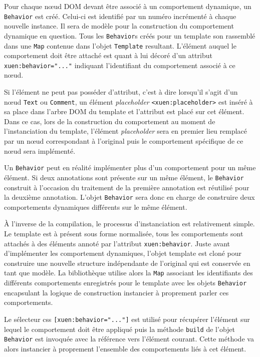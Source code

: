 Pour chaque nœud DOM devant être associé à un comportement dynamique, un \texttt{Behavior} est créé. Celui-ci est identifié par un numéro incrémenté à chaque nouvelle instance. Il sera de modèle pour la construction du comportement dynamique en question. Tous les \texttt{Behavior}s créés pour un template son rassemblé dans une \texttt{Map} contenue dans l'objet \texttt{Template} resultant. L'élément auquel le comportement doit être attaché est quant à lui décoré d'un attribut \texttt{xuen:behavior="..."} indiquant l'identifiant du comportement associé à ce nœud.

Si l'élément ne peut pas posséder d'attribut, c'est à dire lorsqu'il s'agit d'un nœud \texttt{Text} ou \texttt{Comment}, un élément \emph{placeholder} \texttt{<xuen:placeholder>} est inséré à sa place dans l'arbre DOM du template et l'attribut est placé sur cet élément. Dans ce cas, lors de la construction du comportement au moment de l'instanciation du template, l'élément \emph{placeholder} sera en premier lieu remplacé par un nœud correspondant à l'original puis le comportement spécifique de ce nœud sera implémenté.

Un \texttt{Behavior} peut en réalité implémenter plus d'un comportement pour un même élément. Si deux annotations sont présente sur un même élément, le \texttt{Behavior} construit à l'occasion du traitement de la première annotation est réutilisé pour la deuxième annotation. L'objet \texttt{Behavior} sera donc en charge de construire deux comportements dynamiques différents sur le même élément.

À l'inverse de la compilation, le processus d'instanciation est relativement simple. Le template est à présent sous forme normalisée, tous les comportements sont attachés à des éléments annoté par l'attribut \texttt{xuen:behavior}. Juste avant d'implémenter les comportement dynamiques, l'objet template est cloné pour construire une nouvelle structure indépendante de l'original qui est conservée en tant que modèle. La bibliothèque utilise alors la \texttt{Map} associant les identifiants des différents comportements enregistrés pour le template avec les objets \texttt{Behavior} encapsulant la logique de construction instancier à proprement parler ces comportements.

Le sélecteur css \texttt{[xuen:behavior="..."]} est utilisé pour récupérer l'élément sur lequel le comportement doit être appliqué puis la méthode \texttt{build} de l'objet \texttt{Behavior} est invoquée avec la référence vers l'élément courant. Cette méthode va alors instancier à proprement l'ensemble des comportements liés à cet élément.


